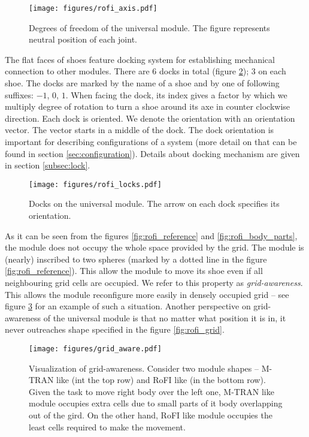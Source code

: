 \begin{figure}
    \centering
    \texttt{[image: figures/rofi\_axis.pdf]}
    \caption{Degrees of freedom of the universal module. The figure represents neutral position of each joint.}
    \label{fig:rofi_axis}
\end{figure}

The flat faces of shoes feature docking system for establishing mechanical
connection to other modules. There are 6 docks in total (figure
\ref{fig:rofi_locks}); 3 on each shoe. The docks are marked by the name of a
shoe and by one of following suffixes: $-1$, $0$, $1$. When facing the dock, its
index gives a factor by which we multiply degree of rotation to turn a shoe
around its axe in counter clockwise direction. Each dock is oriented. We denote
the orientation with an orientation vector. The vector starts in a middle of the
dock. The dock orientation is important for describing configurations of a
system (more detail on that can be found in section \ref{sec:configuration}).
Details about docking mechanism are given in section \ref{subsec:lock}.

\begin{figure}
    \centering
    \texttt{[image: figures/rofi\_locks.pdf]}
    \caption{Docks on the universal module. The arrow on each dock specifies its orientation.}
    \label{fig:rofi_locks}
\end{figure}

As it can be seen from the figures \ref{fig:rofi_reference} and
\ref{fig:rofi_body_parts}, the module does not occupy the whole space provided
by the grid. The module is (nearly) inscribed to two spheres (marked by a dotted
line in the figure \ref{fig:rofi_reference}). This allow the module to move its
shoe even if all neighbouring grid cells are occupied. We refer to this property
as \emph{grid-awareness}. This allows the module reconfigure more easily in
densely occupied grid -- see figure \ref{fig:grid_aware} for an example of such
a situation. Another perspective on grid-awareness of the universal module is
that no matter what position it is in, it never outreaches shape specified in
the figure \ref{fig:rofi_grid}.

\begin{figure}
    \centering
    \texttt{[image: figures/grid\_aware.pdf]}
    \caption{Visualization of grid-awareness. Consider two module shapes -- M-TRAN\cite{haruhisa_kurokawa_m-tran_2003}
     like (int the top row) and RoFI like (in the bottom row). Given the task to
     move right body over the left one, M-TRAN like module occupies extra cells
     due to small parts of it body overlapping out of the gird. On the other
     hand, RoFI like module occupies the least cells required to make the
     movement.   }
    \label{fig:grid_aware}
\end{figure}

